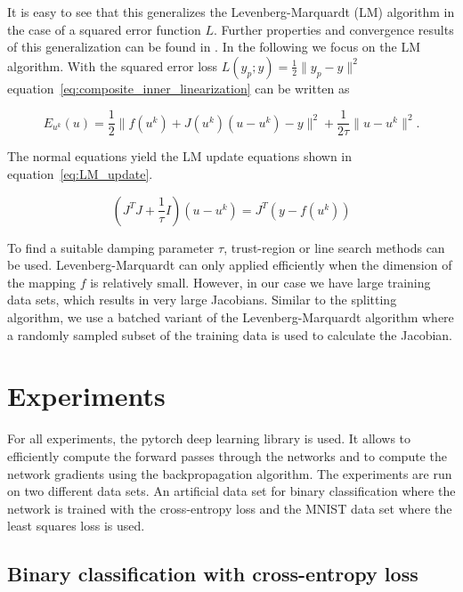 \documentclass[english,11pt,a4paper]{article}
\begin{document}
It is easy to see that this generalizes the Levenberg-Marquardt (LM) algorithm in the case of a squared error function $L$. Further properties and convergence results of this generalization can be found in \cite{lewis2016proximal}. In the following we focus on the LM algorithm. With the squared error loss $L(y_p;y) = \frac{1}{2} \|y_p - y\|^2$ equation~\ref{eq:composite_inner_linearization} can be written as

\begin{equation}
	E_{u^k}(u) = \frac{1}{2} \|f(u^k) + J(u^k)(u - u^k) - y\|^2 + \frac{1}{2 \tau} \| u - u^k \|^2.
	\label{eq:linearized_ls}
\end{equation}

The normal equations yield the LM update equations shown in equation~\ref{eq:LM_update}.

\begin{equation}
	(J^T J + \frac{1}{\tau} I) (u - u^k) = J^T(y - f(u^k))
	\label{eq:LM_update}
\end{equation}

To find a suitable damping parameter $\tau$, trust-region or line search methods can be used. Levenberg-Marquardt can only applied efficiently when the dimension of the mapping $f$ is relatively small. However, in our case we have large training data sets, which results in very large Jacobians. Similar to the splitting algorithm, we use a batched variant of the Levenberg-Marquardt algorithm where a randomly sampled subset of the training data is used to calculate the Jacobian.

\section{Experiments}

For all experiments, the pytorch deep learning library is used. It allows to efficiently compute the forward passes through the networks and to compute the network gradients using the backpropagation algorithm. The experiments are run on two different data sets. An artificial data set for binary classification where the network is trained with the cross-entropy loss and the MNIST data set where the least squares loss is used.

\subsection{Binary classification with cross-entropy loss}
\end{document}
